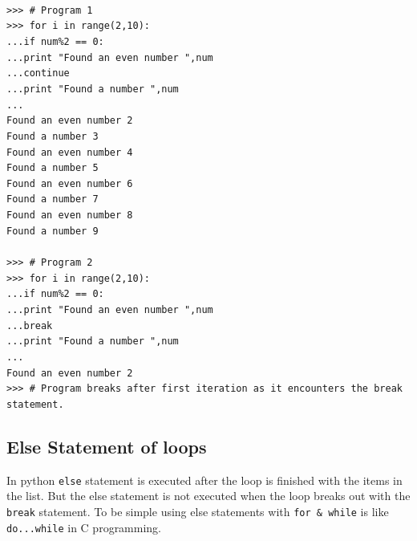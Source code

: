 \documentclass[12pt,a4paper]{article}
\begin{document}
\texttt{
\\
>>> \# Program 1\\
>>> for i in range(2,10):\\
...\hspace{30pt}if num\%2 == 0:\\
...\hspace{30pt}\hspace{30pt}print "Found an even number ",num\\
...\hspace{30pt}\hspace{30pt}continue\\
...\hspace{30pt}print "Found a number ",num\\
...\\
Found an even number 2\\
Found a number 3\\
Found an even number 4\\
Found a number 5\\
Found an even number 6\\
Found a number 7\\
Found an even number 8\\
Found a number 9\\
\\
>>> \# Program 2\\
>>> for i in range(2,10):\\
...\hspace{30pt}if num\%2 == 0:\\
...\hspace{30pt}\hspace{30pt}print "Found an even number ",num\\
...\hspace{30pt}\hspace{30pt}break\\
...\hspace{30pt}print "Found a number ",num\\
...\\
Found an even number 2\\
>>> \# Program breaks after first iteration as it encounters the break statement.
}

\subsection{Else Statement of loops}
In python \texttt{else} statement is executed after the loop is finished with the items in the list. But the else statement is not executed when the loop breaks out with the \texttt{break} statement. To be simple using else statements with \texttt{for \& while} is like \texttt{do...while} in C programming.
\end{document}
